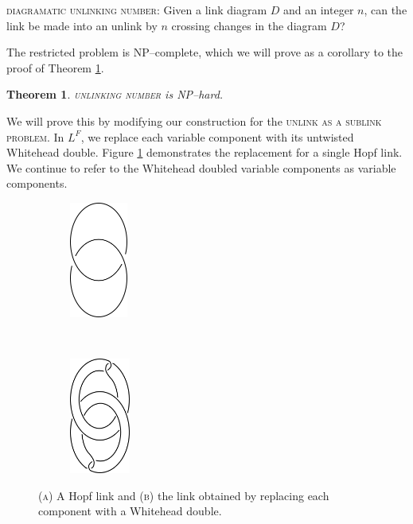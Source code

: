 \documentclass[12pt]{amsart}
\newtheorem{thm}{Theorem}
\theoremstyle{definition}
\theoremstyle{remark}
\begin{document}
\vspace{0.14in}
\textsc{diagramatic unlinking number}: Given a link diagram $D$ and an integer $n$,  can the link be made into an unlink by $n$ crossing changes in the diagram $D$?
\vspace{0.14in}

The restricted problem is NP--complete, which we will prove as a corollary to the proof of Theorem \ref{thm_unlinking}.


\begin{thm}
\textsc{unlinking number} is NP--hard.
\label{thm_unlinking}
\end{thm}



We will prove this by modifying our construction for the \textsc{unlink as a sublink problem}.
In $L^F$,  we replace each variable component with its untwisted Whitehead double.
Figure \ref{fig_hopfwhitehead} demonstrates the replacement for a single Hopf link.
We continue to refer to the Whitehead doubled variable components as variable components.

\begin{figure}[ht]
\centering
    \begin{subfigure}[b]{0.4\textwidth}
        \centering
        \includegraphics[height=1.5in]{singlehopf.png}
        \caption{}
    \end{subfigure}%
~
    \begin{subfigure}[b]{0.4\textwidth}
        \centering
        \includegraphics[height=1.5in]{singlehopf_wdouble.png}
        \caption{}
    \end{subfigure}

\caption{(\textsc{a}) A Hopf link and (\textsc{b}) the link obtained by replacing each component with a Whitehead double.}
\label{fig_hopfwhitehead}
\end{figure}
\end{document}
